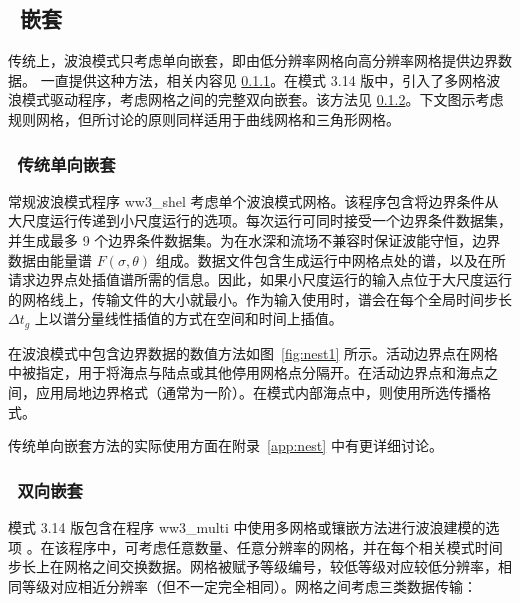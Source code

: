 \vssub
\subsection{~嵌套} \label{sub:num_nest}

\noindent
传统上，波浪模式只考虑单向嵌套，即由低分辨率网格向高分辨率网格提供边界数据。\ws{} 一直提供这种方法，相关内容见 \para\ref{sub:one_way}。在模式 3.14 版中，引入了多网格波浪模式驱动程序，考虑网格之间的完整双向嵌套。该方法见 \para\ref{sub:two_way}。下文图示考虑规则网格，但所讨论的原则同样适用于曲线网格和三角形网格。


\vssub
\subsubsection{~传统单向嵌套} \label{sub:one_way}
\vssub



常规波浪模式程序 {\file ww3\_shel} 考虑单个波浪模式网格。该程序包含将边界条件从大尺度运行传递到小尺度运行的选项。每次运行可同时接受一个边界条件数据集，并生成最多 9 个边界条件数据集。为在水深和流场不兼容时保证波能守恒，边界数据由能量谱 $F(\sigma,\theta)$ 组成。数据文件包含生成运行中网格点处的谱，以及在所请求边界点处插值谱所需的信息。因此，如果小尺度运行的输入点位于大尺度运行的网格线上，传输文件的大小就最小。作为输入使用时，谱会在每个全局时间步长 $\Delta t_g$ 上以谱分量线性插值的方式在空间和时间上插值。

在波浪模式中包含边界数据的数值方法如图~\ref{fig:nest1} 所示。活动边界点在网格中被指定，用于将海点与陆点或其他停用网格点分隔开。在活动边界点和海点之间，应用局地边界格式（通常为一阶）。在模式内部海点中，则使用所选传播格式。

传统单向嵌套方法的实际使用方面在附录~\ref{app:nest} 中有更详细讨论。


\vssub
\subsubsection{~双向嵌套} \label{sub:two_way}
\vssub

模式 3.14 版包含在程序 {\file ww3\_multi} 中使用多网格或镶嵌方法进行波浪建模的选项 \citep{tol:Vict06a,
  tol:MMAB07b, tol:OMOD08b}。在该程序中，可考虑任意数量、任意分辨率的网格，并在每个相关模式时间步长上在网格之间交换数据。网格被赋予等级编号，较低等级对应较低分辨率，相同等级对应相近分辨率（但不一定完全相同）。网格之间考虑三类数据传输：

